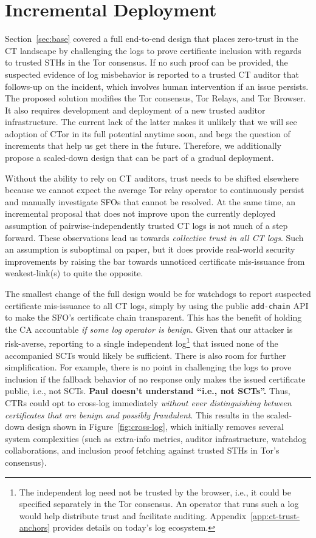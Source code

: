 \section{Incremental Deployment} \label{sec:incremental}
Section~\ref{sec:base} covered a full end-to-end design that places zero-trust
in the CT landscape by challenging the logs to prove certificate inclusion with
regards to trusted STHs in the Tor consensus.  If no such proof can be provided,
the suspected evidence of log misbehavior is reported to a trusted CT auditor
that follows-up on the incident, which involves human intervention if an issue
persists.  The proposed solution modifies the Tor consensus, Tor Relays, and Tor
Browser.  It also requires development and deployment of a new trusted auditor
infrastructure.  The current lack of the latter makes it unlikely that
we will see
adoption of CTor in its full potential anytime soon, and begs the question of
increments that help us get there in the future.  Therefore, we additionally
propose a scaled-down design that can be part of a gradual deployment.

Without the ability to rely on CT auditors, trust needs to be shifted elsewhere
because we cannot expect the average Tor relay operator to continuously persist
and manually investigate SFOs that cannot be resolved.  At the same time, an
incremental proposal that does not improve upon the currently deployed
assumption of pairwise-independently trusted CT logs is not much of a
step forward.
These observations lead us towards
	\emph{collective trust in all CT logs}.
Such an assumption is suboptimal on paper, but it does provide real-world
security improvements by raising the bar towards unnoticed certificate
mis-issuance from weakest-link(s) to quite the opposite.

The smallest change of the full design would be for watchdogs to report
suspected certificate mis-issuance to all CT logs, simply by using the public
\texttt{add-chain} API to make the SFO's certificate chain transparent.  This
has the benefit of holding the CA accountable \emph{if some log operator is
benign}.  Given that our attacker is risk-averse, reporting to a single
independent log\footnote{%
	The independent log need not be trusted by the browser, i.e., it could be
	specified separately in the Tor consensus.  An operator that runs such a
	log would help distribute trust and facilitate auditing.
	Appendix~\ref{app:ct-trust-anchors} provides details on today's log
	ecosystem.
} that issued none of the accompanied SCTs would likely be sufficient.  There is
also room for further simplification.  For example, there is no point in
challenging the logs to prove inclusion if the fallback behavior of no response
only makes the issued certificate public, i.e., not SCTs.
{\bf \color{red} Paul doesn't understand ``i.e., not SCTs''.}
  Thus, CTRs could opt
to cross-log immediately \emph{without ever distinguishing between certificates
that are benign and possibly fraudulent}.  This results in the scaled-down
design shown in Figure~\ref{fig:cross-log}, which initially removes several
system complexities (such as extra-info metrics, auditor infrastructure,
watchdog collaborations, and inclusion proof fetching against trusted STHs in
Tor's consensus).

